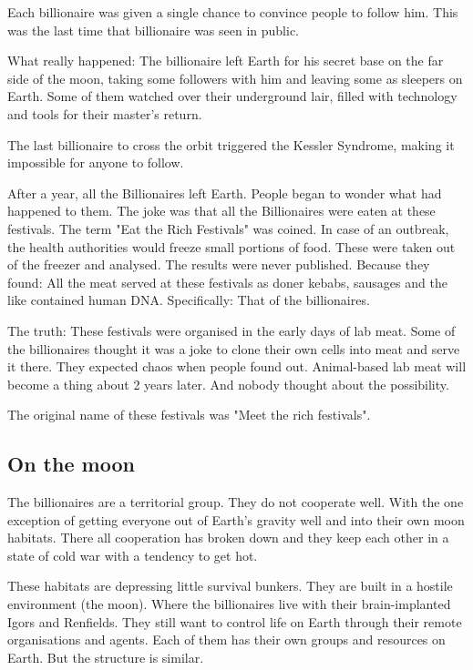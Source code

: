 Each billionaire was given a single chance to convince people to follow him. This was the last time that billionaire was seen in public.

What really happened: The billionaire left Earth for his secret base on the far side of the moon, taking some followers with him and leaving some as sleepers on Earth. Some of them watched over their underground lair, filled with technology and tools for their master's return.

The last billionaire to cross the orbit triggered the Kessler Syndrome, making it impossible for anyone to follow.

After a year, all the Billionaires left Earth. People began to wonder what had happened to them. The joke was that all the Billionaires were eaten at these festivals. The term "Eat the Rich Festivals" was coined. In case of an outbreak, the health authorities would freeze small portions of food. These were taken out of the freezer and analysed. The results were never published. Because they found: All the meat served at these festivals as doner kebabs, sausages and the like contained human DNA. Specifically: That of the billionaires.

The truth: These festivals were organised in the early days of lab meat. Some of the billionaires thought it was a joke to clone their own cells into meat and serve it there. They expected chaos when people found out. Animal-based lab meat will become a thing about 2 years later. And nobody thought about the possibility.

The original name of these festivals was "Meet the rich festivals".

\subsection{On the moon}

The billionaires are a territorial group. They do not cooperate well. With the one exception of getting everyone out of Earth's gravity well and into their own moon habitats. There all cooperation has broken down and they keep each other in a state of cold war with a tendency to get hot.

These habitats are depressing little survival bunkers. They are built in a hostile environment (the moon). Where the billionaires live with their brain-implanted Igors and Renfields. They still want to control life on Earth through their remote organisations and agents. Each of them has their own groups and resources on Earth. But the structure is similar.

